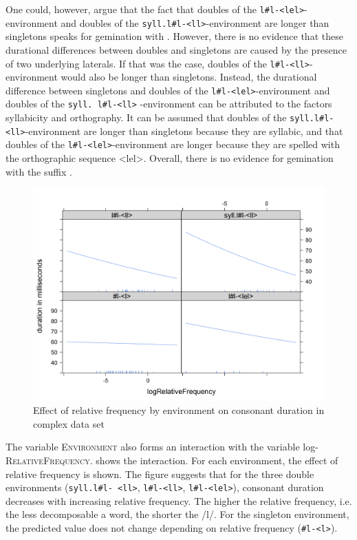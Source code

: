 One could, however, argue that the fact that doubles of the \texttt{l\#l-<lel>}- environment and doubles of the \texttt{syll.l\#l-<ll>}-environment are  longer than singletons speaks for gemination with . However, there is no evidence that these durational differences between doubles and singletons are caused by the presence of two underlying laterals. If that was the case, doubles of the \texttt{l\#l-<ll>}-environment would also be longer than singletons. 
Instead, the durational difference between singletons and doubles of the \texttt{l\#l-<lel>}-environment and doubles of the \texttt{syll. l\#l-<ll>} -environment can be attributed to the factors syllabicity and orthography. It can be assumed that doubles of the  \texttt{syll.l\#l-<ll>}-environment are longer than singletons because they are syllabic, and that doubles of the  \texttt{l\#l-<lel>}-environment are longer because they are spelled with the orthographic sequence <lel>. 
 Overall, there is no evidence for gemination with the suffix .


\begin{figure} [b!]
	\centering
	\includegraphics [scale=0.5] {images/Experiment/LyModelInterRelFreqEnv}
	\caption{Effect of relative frequency by environment on consonant duration in complex data set}
	\label{fig:Rel Env lyComplex experiment}
	
\end{figure}



The variable \textsc{Environment} also forms an interaction with the variable log- \textsc{RelativeFrequency}.  shows the interaction. For each environment, the effect of relative frequency is shown. 
The figure suggests that for the three double environments (\texttt{syll.l\#l- <ll>}, \texttt{l\#l-<ll>}, \texttt{l\#l-<lel>}), consonant duration decreases with increasing relative frequency. The higher the relative frequency, i.e. the less decomposable a word, the shorter the /l/. For the singleton environment, the predicted value does not change depending on relative frequency (\texttt{\#l-<l>}).




